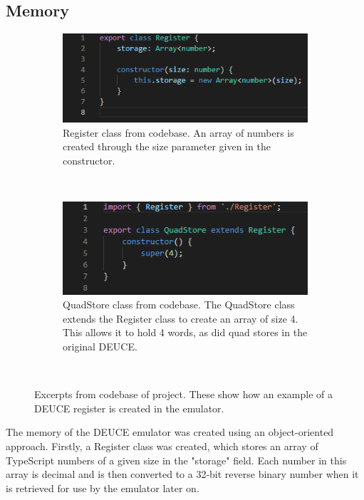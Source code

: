 \documentclass{l4proj}
\begin{document}
\subsection{Memory}
\begin{figure}[h]
	\centering
	\begin{subfigure}[t]{0.45\textwidth}
		\includegraphics[width=\textwidth]{images/register-class}
		\caption{Register class from codebase. An array of numbers is created through the size parameter given in the constructor.}
		\label{fig:reg-class}
	\end{subfigure}
	\quad
	~ %
	\begin{subfigure}[t]{0.45\textwidth}
		\includegraphics[width=\textwidth]{images/quad-store-class}
		\caption{QuadStore class from codebase. The QuadStore class extends the Register class to create an array of size 4. This allows it to hold 4 words, as did quad stores in the original DEUCE.}
		\label{fig:quad-class}
	\end{subfigure}
	~ %
	\caption{Excerpts from codebase of project. These show how an example of a DEUCE register is created in the emulator.}
	\label{fig:ace-comps}
\end{figure}
The memory of the DEUCE emulator was created using an object-oriented approach. Firstly, a Register class was created, which stores an array of TypeScript numbers of a given size in the "storage" field. Each number in this array is decimal and is then converted to a 32-bit reverse binary number when it is retrieved for use by the emulator later on. 
\end{document}
